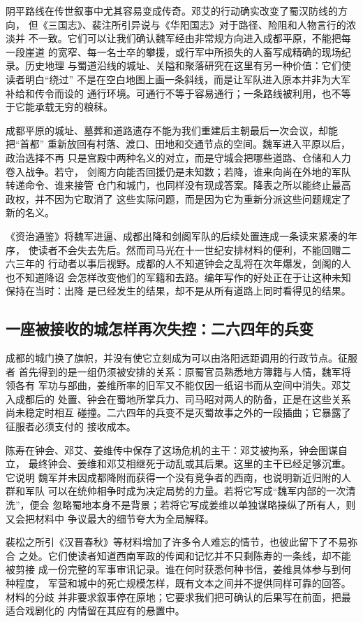 阴平路线在传世叙事中尤其容易变成传奇。邓艾的行动确实改变了蜀汉防线的方向，
但《三国志》、裴注所引异说与《华阳国志》对于路径、险阻和人物言行的浓淡并
不一致。它们可以让我们确认魏军经由非常规方向进入成都平原，不能把每一段崖道
的宽窄、每一名士卒的攀援，或行军中所损失的人畜写成精确的现场纪录。历史地理
与蜀道沿线的城址、关隘和聚落研究在这里有另一种价值：它们使读者明白“绕过”
不是在空白地图上画一条斜线，而是让军队进入原本并非为大军补给和传令而设的
通行环境。可通行不等于容易通行；一条路线被利用，也不等于它能承载无穷的粮秣。

成都平原的城址、墓葬和道路遗存不能为我们重建后主朝最后一次会议，却能把“首都”
重新放回有村落、渡口、田地和交通节点的空间。魏军进入平原以后，政治选择不再
只是宫殿中两种名义的对立，而是守城会把哪些道路、仓储和人力卷入战争。若守，
剑阁方向能否回援仍是未知数；若降，谁来向尚在外地的军队转递命令、谁来接管
仓门和城门，也同样没有现成答案。降表之所以能终止最高政权，并不因为它取消了
这些实际问题，而是因为它为重新分派这些问题规定了新的名义。

《资治通鉴》将魏军进逼、成都出降和剑阁军队的后续处置连成一条读来紧凑的年序，
使读者不会失去先后。然而司马光在十一世纪安排材料的便利，不能回赠二六三年的
行动者以事后视野。成都的人不知道钟会之乱将在次年爆发，剑阁的人也不知道降诏
会怎样改变他们的军籍和去路。编年写作的好处正在于让这种未知保持在当时：出降
是已经发生的结果，却不是从所有道路上同时看得见的结果。

\subsection{一座被接收的城怎样再次失控：二六四年的兵变}

成都的城门换了旗帜，并没有使它立刻成为可以由洛阳远距调用的行政节点。征服者
首先得到的是一组仍须被安排的关系：原蜀官员熟悉地方簿籍与人情，魏军将领各有
军功与部曲，姜维所率的旧军又不能仅因一纸诏书而从空间中消失。邓艾入成都后的
处置、钟会在蜀地所掌兵力、司马昭对两人的防备，正是在这些关系尚未稳定时相互
碰撞。二六四年的兵变不是灭蜀故事之外的一段插曲；它暴露了征服者必须支付的
接收成本。

陈寿在钟会、邓艾、姜维传中保存了这场危机的主干：邓艾被拘系，钟会图谋自立，
最终钟会、姜维和邓艾相继死于动乱或其后果。这里的主干已经足够沉重。它说明
魏军并未因成都降附而获得一个没有竞争者的西南，也说明新近归附的人群和军队
可以在统帅相争时成为决定局势的力量。若将它写成“魏军内部的一次清洗”，便会
忽略蜀地本身不是背景；若将它写成姜维以单独谋略操纵了所有人，则又会把材料中
争议最大的细节夸大为全局解释。

裴松之所引《汉晋春秋》等材料增加了许多令人难忘的情节，也彼此留下了不易弥合
之处。它们使读者知道西南军政的传闻和记忆并不只剩陈寿的一条线，却不能被剪接
成一份完整的军事审讯记录。谁在何时获悉何种书信，姜维具体参与到何种程度，
军营和城中的死亡规模怎样，既有文本之间并不提供同样可靠的回答。材料的分歧
并非要求叙事停在原地；它要求我们把可确认的后果写在前面，把最适合戏剧化的
内情留在其应有的悬置中。

